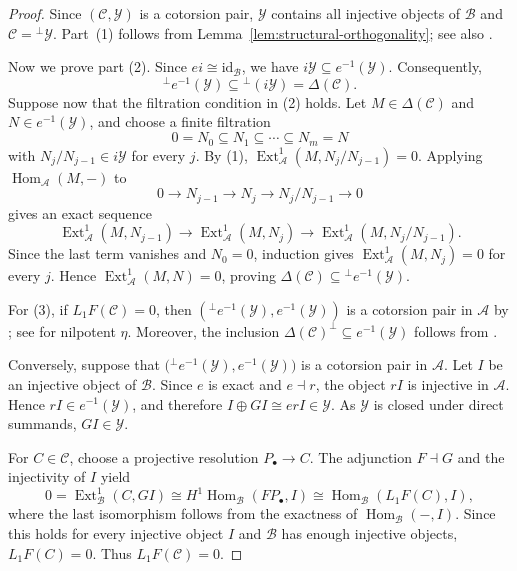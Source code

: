 \documentclass[11pt]{amsart}
\theoremstyle{definition}
\theoremstyle{remark}
\theoremstyle{plain}
\numberwithin{equation}{section}
\begin{document}
\begin{proof}
	Since $(\mathcal{C},\mathcal{Y})$ is a cotorsion pair, $\mathcal{Y}$ contains all injective objects of $\mathcal{B}$ and
	$\mathcal{C}={}^\perp\mathcal{Y}$.
	Part~(1) follows from Lemma~\ref{lem:structural-orthogonality}; see also
	\cite[Lemma~3.3 and Theorem~3.4]{ChenQinYang}.
	
	Now we prove part (2). Since $ei\cong\mathrm{id}_{\mathcal{B}}$, we have
	$i\mathcal{Y}\subseteq e^{-1}(\mathcal{Y})$. Consequently,
	\[
	{}^\perp e^{-1}(\mathcal{Y})
	\subseteq {}^\perp(i\mathcal{Y})
	=\Delta(\mathcal{C}).
	\]
	Suppose now that the filtration condition in (2) holds.
	Let $M\in\Delta(\mathcal{C})$ and $N\in e^{-1}(\mathcal{Y})$,
	and choose a finite filtration
	\[
	0=N_0\subseteq N_1\subseteq\cdots\subseteq N_m=N
	\]
	with $N_j/N_{j-1}\in i\mathcal{Y}$ for every $j$.
	By (1),
	$\operatorname{Ext}^1_{\mathcal{A}}(M,N_j/N_{j-1})=0$.
	Applying $\operatorname{Hom}_{\mathcal{A}}(M,-)$ to
	\[
	0\longrightarrow N_{j-1}\longrightarrow N_j
	\longrightarrow N_j/N_{j-1}\longrightarrow 0
	\]
	 gives an exact sequence
	\[
	\operatorname{Ext}^1_{\mathcal{A}}(M,N_{j-1})
	\longrightarrow \operatorname{Ext}^1_{\mathcal{A}}(M,N_j)
	\longrightarrow \operatorname{Ext}^1_{\mathcal{A}}(M,N_j/N_{j-1}).
	\]
	Since the last term vanishes and $N_0=0$, induction gives
	$\operatorname{Ext}^1_{\mathcal{A}}(M,N_j)=0$ for every $j$. Hence $\operatorname{Ext}^1_{\mathcal{A}}(M,N)=0$, proving $\Delta(\mathcal{C})\subseteq{}^\perp e^{-1}(\mathcal{Y})$.
	
	For (3), if $L_1F(\mathcal{C}) = 0$, then $({}^\perp e^{-1}(\mathcal{Y}), e^{-1}(\mathcal{Y}))$ is a cotorsion pair in $\mathcal{A}$ by \cite[Theorem~3.10]{ChenQinYang}; see \cite[Theorem~3.5]{Hu} for nilpotent $\eta$. Moreover, the inclusion $\Delta(\mathcal{C})^\perp \subseteq e^{-1}(\mathcal{Y})$ follows from \cite[Proposition~3.11]{ChenQinYang}.
	
	Conversely, suppose that $\bigl({}^\perp e^{-1}(\mathcal{Y}),e^{-1}(\mathcal{Y})\bigr)$
	is a cotorsion pair in $\mathcal{A}$. Let $I$ be an injective object of $\mathcal{B}$.
	Since $e$ is exact and $e\dashv r$, the object $rI$ is injective in $\mathcal{A}$. Hence $rI\in e^{-1}(\mathcal{Y})$, and therefore $I\oplus GI\cong erI\in\mathcal{Y}$. As $\mathcal{Y}$ is closed under direct summands, $GI\in\mathcal{Y}$.
	
	For $C\in\mathcal{C}$, choose a projective resolution $P_\bullet\to C$. The adjunction $F\dashv G$ and the injectivity of $I$ yield
	\[
	0 = \operatorname{Ext}^1_{\mathcal{B}}(C, GI) \cong H^1\operatorname{Hom}_{\mathcal{B}}(FP_\bullet, I)
	\cong \operatorname{Hom}_{\mathcal{B}}(L_1F(C), I),
	\]
	where the last isomorphism follows from the exactness of $\operatorname{Hom}_{\mathcal{B}}(-,I)$.
	Since this holds for every injective object $I$ and $\mathcal{B}$ has enough injective objects, $L_1F(C)=0$. Thus $L_1F(\mathcal{C})=0$.
\end{proof}
\end{document}
